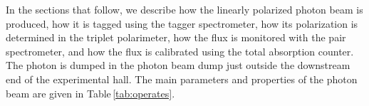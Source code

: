 In the sections that follow, we describe how the linearly polarized photon beam is produced,  how it is tagged using the tagger spectrometer, how its polarization is determined in the
triplet polarimeter, how the flux is monitored with the pair spectrometer, and how the flux is calibrated using the total absorption counter. The photon is dumped in the photon beam dump
just outside the downstream end of the experimental hall.
The main parameters and properties of the photon beam are given in Table\,\ref{tab:operates}.
  



\begin{table}[tbp]
\begin{center}
\caption[Typical operating parameters for an experiment]{\label{tab:operates}
{\color{red}Note: The values in this table need to be checked!}
Typical operating parameters for an experiment using the coherent bremsstrahlung beam,
calculated with the properties
listed in Table \ref{tab:elecprop}, a diamond radiator of thickness 50~$\mu$m, and the standard
primary collimator of diameter 5.0~mm located at its nominal position.
The electron beam current is taken to 
be $150$~nA. The hadronic rates are calculated for 
a 30~cm liquid hydrogen target.}


\end{center}
\end{table}
